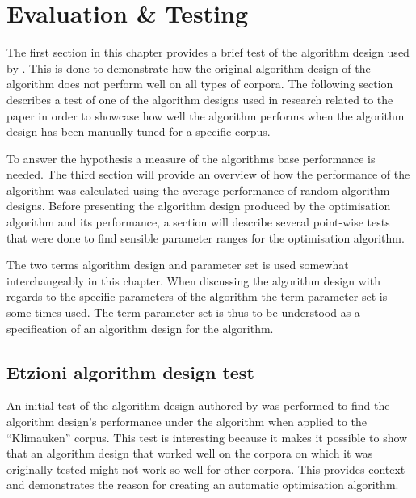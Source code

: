

\chapter{Evaluation \& Testing} %

\label{EvaluationTesting} %


The first section in this chapter provides a brief test of the algorithm design used by \cite{Oren1998}. This is done to demonstrate how the original algorithm design of the \STC algorithm does not perform well on all types of corpora. The following section describes a test of one of the algorithm designs used in research related to the  paper \parencite{Moe2013compact} in order to showcase how well the algorithm performs when the algorithm design has been manually tuned for a specific corpus.

To answer the hypothesis a measure of the \CTC algorithms base performance is needed. The third section will provide an overview of how the performance of the \CTC algorithm was calculated using the average performance of random algorithm designs. Before presenting the algorithm design produced by the optimisation algorithm and its performance, a section will describe several point-wise tests that were done to find sensible parameter ranges for the optimisation algorithm.

The two terms algorithm design and parameter set is used somewhat interchangeably in this chapter. When discussing the algorithm design with regards to the specific parameters of the algorithm the term parameter set is some times used. The term parameter set is thus to be understood as a specification of an algorithm design for the \CTC algorithm.

\section{Etzioni algorithm design test}
An initial test of the algorithm design authored by \citeauthor{Oren1998} was performed to find the algorithm design's performance under the \CTC algorithm when applied to the ``Klimauken'' corpus. This test is interesting because it makes it possible to show that an algorithm design that worked well on the corpora on which it was originally tested might not work so well for other corpora. This provides context and demonstrates the reason for creating an automatic optimisation algorithm.

